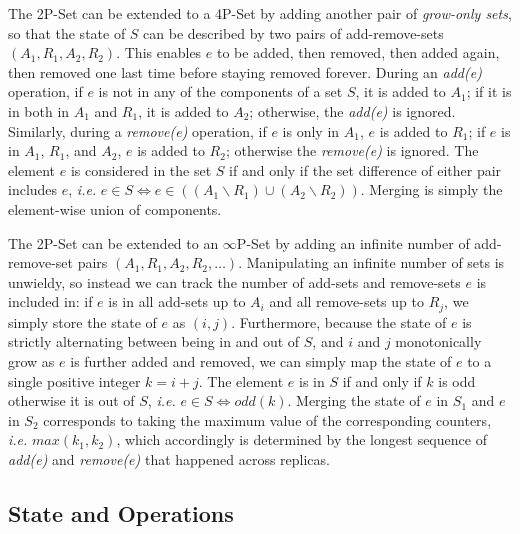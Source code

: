 \documentclass[11pt, oneside]{article}   	%
\begin{document}
The 2P-Set can be extended to a 4P-Set by adding another pair of \textit{grow-only sets}, so that the state of $S$ can be described by two pairs of add-remove-sets $(A_1,R_1,A_2,R_2)$.  This enables $e$ to be added, then removed, then added again, then removed one last time before staying removed forever. During an \textit{add(e)} operation, if $e$ is not in any of the components of a set $S$, it is added to $A_1$; if it is in both in $A_1$ and $R_1$, it is added to $A_2$; otherwise, the \textit{add(e)} is ignored. Similarly, during a \textit{remove(e)} operation, if $e$ is only in $A_1$, $e$ is added to $R_1$; if $e$ is in $A_1$, $R_1$, and $A_2$, $e$ is added to $R_2$; otherwise the \textit{remove(e)} is ignored. The element $e$ is considered in the set $S$ if and only if the set difference of either pair includes $e$, \textit{i.e.} $e \in S \Leftrightarrow e \in  ((A_1 \backslash R_1) \cup (A_2 \backslash R_2))$. Merging is simply the element-wise union of components.

The 2P-Set can be extended to an $\infty$P-Set by adding an infinite number of add-remove-set pairs $(A_1, R_1, A_2, R_2, \dots)$. Manipulating an infinite number of sets is unwieldy, so instead we can track the number of add-sets and remove-sets 
$e$ is included in: if $e$ is in all add-sets up to $A_i$ and all remove-sets up to $R_{j}$, we simply store the state of $e$ as $(i, j)$. Furthermore, because the state of $e$ is strictly alternating between being in and out of $S$, and $i$ and $j$ monotonically grow as $e$ is further added and removed, we can simply map the state of $e$ to a single positive integer $k=i+j$. The element $e$ is in $S$ if and only if $k$ is odd otherwise it is out of $S$, \textit{i.e.} $e \in S \Leftrightarrow odd(k)$. Merging the state of $e$ in $S_1$ and $e$ in $S_2$ corresponds to taking the maximum value of the corresponding counters, \textit{i.e.} $\textit{max}(k_1, k_2)$, which accordingly is determined by the longest sequence of \textit{add(e)} and \textit{remove(e)} that happened across replicas. 

\subsection{State and Operations}
\label{sec:data-type}
\end{document}
